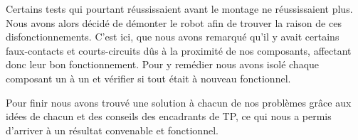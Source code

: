 Certains tests qui pourtant réussissaient avant le montage ne réussissaient plus. Nous avons alors décidé de démonter le robot afin de trouver la raison de ces disfonctionnements. C'est ici, que nous avons remarqué qu'il y avait certains faux-contacts et courts-circuits dûs à la proximité de nos composants, affectant donc leur bon fonctionnement. Pour y remédier nous avons isolé chaque composant un à un et vérifier si tout était à nouveau fonctionnel.

\bigbreak
Pour finir nous avons trouvé une solution à chacun de nos problèmes grâce aux idées de chacun et des conseils des encadrants de TP, ce qui nous a permis d'arriver à un résultat convenable et fonctionnel.



\newpage
